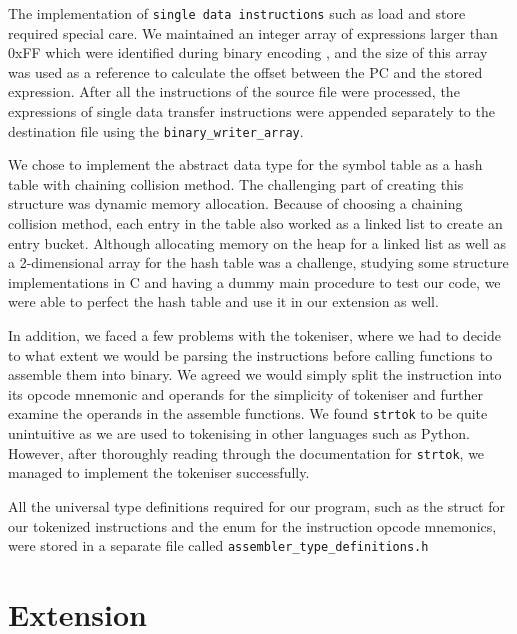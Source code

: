 \documentclass[11pt, letterpaper]{article}
\begin{document}
The implementation of \verb|single data instructions| such as load and store required special care. We maintained an integer array of expressions larger than 0xFF which were identified during binary encoding , and the size of this array was used as a reference to calculate the offset between the PC and the stored expression. After all the instructions of the source file were processed, the expressions of single data transfer instructions were appended separately to the destination file using the \verb|binary_writer_array|.
\\ \newline

We chose to implement the abstract data type for the symbol table as a hash table with chaining collision method. The challenging part of creating this structure was dynamic memory allocation. Because of choosing a chaining collision method, each entry in the table also worked as a linked list to create an entry bucket. Although allocating memory on the heap for a linked list as well as a 2-dimensional array for the hash table was a challenge, studying some structure implementations in C and having a dummy main procedure to test our code, we were able to perfect the hash table and use it in our extension as well.
\\ \newline

In addition, we faced a few problems with the tokeniser, where we had to decide to what extent we would be parsing the instructions before calling functions to assemble them into binary. We agreed we would simply split the instruction into its opcode mnemonic and operands for the simplicity of tokeniser and further examine the operands in the assemble functions.
We found \verb|strtok| to be quite unintuitive as we are used to tokenising in other languages such as Python. However, after thoroughly reading through the documentation for \verb|strtok|, we managed to implement the tokeniser successfully.
\\ \newline

All the universal type definitions required for our program, such as the struct for our tokenized instructions and the enum for the instruction opcode mnemonics, were stored in a separate file called \verb|assembler_type_definitions.h|

\section{Extension}
\end{document}

